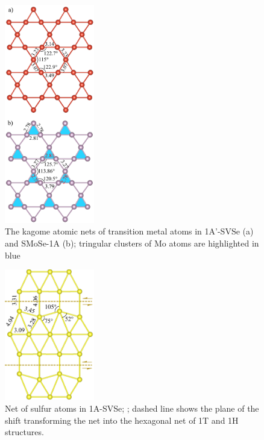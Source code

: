 \documentclass[a4paperm]{article}
\begin{document}
\begin{figure}
	\includegraphics [width=0.35\textwidth]{airss1_tm.png}
	\caption{The kagome atomic nets of transition metal atoms in 1A'-SVSe (a) and SMoSe-1A (b); tringular clusters of Mo atoms are highlighted in blue} 
\label{airss1_tm}
\end{figure}

\begin{figure}
	\includegraphics[width=0.35\textwidth]{airss1v_s.png}
	\caption{Net of sulfur atoms in 1A-SVSe; ; dashed line shows the plane of the shift transforming the net into the hexagonal net of 1T and 1H structures.}
\label{airss1_s}
\end{figure}
\end{document}
